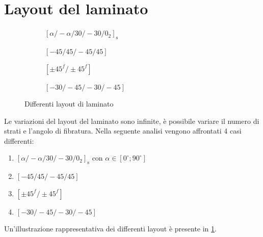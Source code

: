 \documentclass[a4paper,num-refs]{oup-contemporary}
\begin{document}
\section{Layout del laminato}

\begin{figure}[bt!]
	\centering\captionsetup[subfigure]{justification=centering}
	
	\begin{subfigure}[c]{0.24\textwidth}
		\centering
	\def\svgwidth{\textwidth}

		\caption{$[\alpha /-\alpha / 30 /-30 / 0_{2}]_{\mathrm{s}}$ }
		
	\end{subfigure}
	\hfill
	\begin{subfigure}[c]{0.24\textwidth}
		\centering 
		\def\svgwidth{\textwidth}

		\caption{$[-45 / 45 /-45 / 45]$}
		
	\end{subfigure}
	\hfill
	\begin{subfigure}[c]{0.24\textwidth}
		\centering
		\def\svgwidth{\textwidth}

		\caption{$[\pm 45^{f} / \pm 45^{f}]$}
		
	\end{subfigure}
	\hfill
	\begin{subfigure}[c]{0.24\textwidth}
		\centering
		\def\svgwidth{\textwidth}
		
		\caption{$[-30 /-45 /-30 /-45]$}
		
	\end{subfigure}
	\hfill
	\caption{Differenti layout di laminato }
	\label{fig:laminates}
\end{figure}

Le variazioni del layout del laminato sono infinite, è possibile variare il numero di strati e l'angolo di fibratura. Nella seguente analisi vengono affrontati 4 casi differenti:

\begin{enumerate}[label=(\alph*)]
	\item $\left[\alpha /-\alpha / 30 /-30 / 0_{2}\right]_{\mathrm{s}}$ con $\alpha\in\left[0^\circ;90^\circ\right]$
	\item $\left[-45 / 45 /-45 / 45\right]$
	\item $\left[\pm 45^{f} / \pm 45^{f}\right]$
	\item $\left[-30 /-45 /-30 /-45\right]$
\end{enumerate}

Un'illustrazione rappresentativa dei differenti layout è presente in \cref{fig:laminates}.
\end{document}
